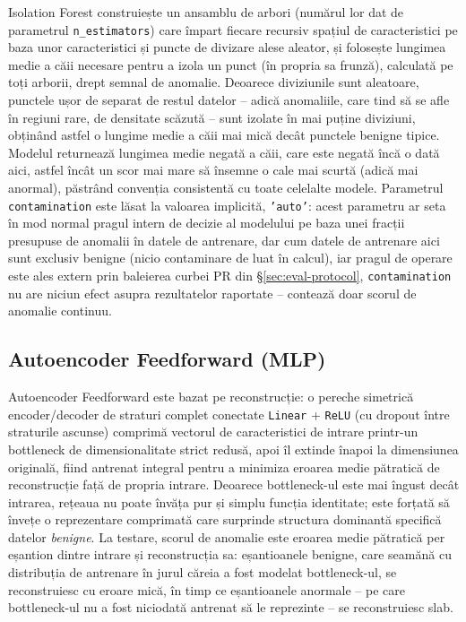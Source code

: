 Isolation Forest construiește un ansamblu de arbori (numărul lor dat de parametrul \texttt{n\_estimators}) care împart fiecare recursiv spațiul de caracteristici pe baza unor caracteristici și puncte de divizare alese aleator, și folosește lungimea medie a căii necesare pentru a izola un punct (în propria sa frunză), calculată pe toți arborii, drept semnal de anomalie. 
Deoarece diviziunile sunt aleatoare, punctele ușor de separat de restul datelor -- adică anomaliile, care tind să se afle în regiuni rare, de densitate scăzută -- sunt izolate în mai puține diviziuni, obținând astfel o lungime medie a căii mai mică decât punctele benigne tipice. Modelul returnează lungimea medie negată a căii, care este negată încă o dată aici, astfel încât un scor mai mare să însemne o cale mai scurtă (adică mai anormal), păstrând convenția consistentă cu toate celelalte modele. 
Parametrul \texttt{contamination} este lăsat la valoarea implicită, \texttt{'auto'}: acest parametru ar seta în mod normal pragul intern de decizie al modelului pe baza unei fracții presupuse de anomalii în datele de antrenare, dar cum datele de antrenare aici sunt exclusiv benigne (nicio contaminare de luat în calcul), iar pragul de operare este ales extern prin baleierea curbei PR din \S\ref{sec:eval-protocol}, \texttt{contamination} nu are niciun efect asupra rezultatelor raportate -- contează doar scorul de anomalie continuu.

\subsection{Autoencoder Feedforward (MLP)}

Autoencoder Feedforward este bazat pe reconstrucție: o pereche simetrică encoder\slash decoder de straturi complet conectate \texttt{Linear} + \texttt{ReLU} (cu dropout între straturile ascunse) comprimă vectorul de caracteristici de intrare printr-un bottleneck de dimensionalitate strict redusă, apoi îl extinde înapoi la dimensiunea originală, fiind antrenat integral pentru a minimiza eroarea medie pătratică de reconstrucție față de propria intrare.
Deoarece bottleneck-ul este mai îngust decât intrarea, rețeaua nu poate învăța pur și simplu funcția identitate; este forțată să învețe o reprezentare comprimată care surprinde structura dominantă specifică datelor \emph{benigne}.
La testare, scorul de anomalie este eroarea medie pătratică per eșantion dintre intrare și reconstrucția sa: eșantioanele benigne, care seamănă cu distribuția de antrenare în jurul căreia a fost modelat bottleneck-ul, se reconstruiesc cu eroare mică, în timp ce eșantioanele anormale -- pe care bottleneck-ul nu a fost niciodată antrenat să le reprezinte -- se reconstruiesc slab.

